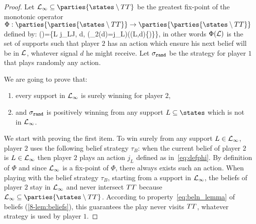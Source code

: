 \begin{proof}


Let $\LL_\infty\subseteq \parties{\states\bh\targets}$
be the greatest fix-point of the monotonic operator
$\Phi:\parties{\parties{\states\bh\targets}}\to \parties{\parties{\states\bh\targets}}$ defined by:
\be
\label{eq:defphi}
\Phi(\LL)=\{L\in \LL \mid
\exists j_L\in J, \forall d\in\signauxdeux, (\action_2(d)=j_L)\implies (\beldeux(L,d)\in \LL \cup \{\emptyset)\}\}\enspace,
\ee
in other words $\Phi(\mathcal{L})$ is the set of supports
such that player $2$ has an action which
ensure his next belief will be in $\mathcal{L}$,
whatever signal $d$ he might receive.
Let $\sigma_{{\tt rand}}$ be the strategy for player $1$ that plays randomly any action.

We are going to prove that:
\begin{enumerate}
\item every support in $\mathcal{L}_\infty$ is surely winning for player $2$,
\item and $\sigma_{{\tt rand}}$ is positively winning from any support $L\subseteq\states$ which is not in $\mathcal{L}_\infty$.
\end{enumerate}

We start with proving the first item.
To win surely from any support $L\in\mathcal{L}_\infty$, player $2$ uses the following
belief strategy $\tau_B$: when the current belief of player $2$ is $L\in\mathcal{L}_\infty$ then player $2$
plays an action $j_L$ defined as in~\eqref{eq:defphi}.
By definition of $\Phi$ and since $\mathcal{L}_\infty$ is a fix-point of $\Phi$,
there always exists such an action.
When playing with the belief strategy $\tau_B$,
starting from a support in $\mathcal{L}_\infty$,
the beliefs of player $2$ stay in $\mathcal{L}_\infty$
and never intersect $TT$ because $\LL_\infty\subseteq \parties{\states\bh\targets}$.
{According to property~\eqref{eq:beln_lemma} of beliefs (\cref{8-lem:beliefs})},
this guarantees the play never visits $TT$,
whatever strategy is used by player $1$.


\end{proof}
